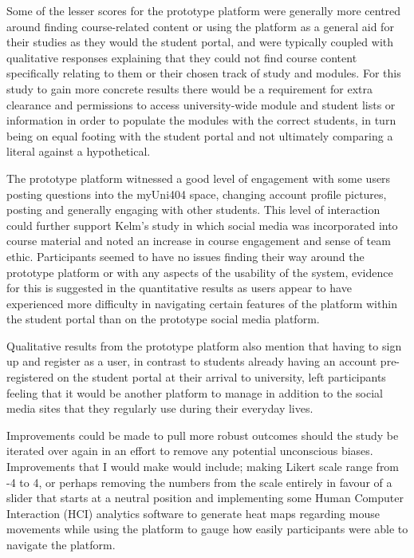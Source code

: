 \documentclass[lettersize,journal]{IEEEtran}
\begin{document}
Some of the lesser scores for the prototype platform were generally more centred around finding course-related content or using the platform as a general aid for their studies as they would the
student portal, and were typically coupled with qualitative responses explaining that they could not find course content specifically relating to them or their chosen track of study and modules.
For this study to gain more concrete results there would be a requirement for extra clearance and permissions to access university-wide module and student lists or information in order to
populate the modules with the correct students, in turn being on equal footing with the student portal and not ultimately comparing a literal against a hypothetical.

The prototype platform witnessed a good level of engagement with some users posting questions into the myUni404 space, changing account profile pictures, posting and generally engaging with other
students. This level of interaction could further support Kelm's \cite{Kelm2011} study in which social media was incorporated into course material and noted an increase in course engagement and sense of
team ethic. Participants seemed to have no issues finding their way around the prototype platform or with any aspects of the usability of the system, evidence for this is suggested in the quantitative
results as users appear to have experienced more difficulty in navigating certain features of the platform within the student portal than on the prototype social media platform.

Qualitative results from the prototype platform also mention that having to sign up and register as a user, in contrast to students already having an account pre-registered on the student portal
at their arrival to university, left participants feeling that it would be another platform to manage in addition to the social media sites that they regularly use during their everyday lives.

Improvements could be made to pull more robust outcomes should the study be iterated over again in an effort to remove any potential unconscious biases. Improvements that I would make would include; making
Likert scale range from -4 to 4, or perhaps removing the numbers from the scale entirely in favour of a slider that starts at a neutral position and implementing some Human Computer Interaction
(HCI) analytics software to generate heat maps regarding mouse movements while using the platform to gauge how easily participants were able to navigate the platform.
\end{document}
